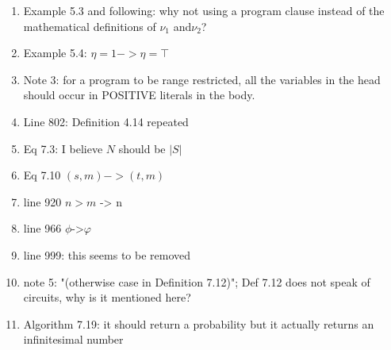 \begin{enumerate}
    \item Example 5.3 and following: why not using a program clause instead of the mathematical definitions of $\nu_1$ and$ \nu_2$?
    \\

    \item Example 5.4: $\eta=1-> \eta=\top$
    \\
    \item Note 3: for a program to be range restricted, all the variables in the head should occur in POSITIVE literals in the body.
    \\
    \item Line 802: Definition 4.14 repeated
    \\
    \item Eq 7.3: I believe $N$ should be $|S|$
    \\
    \item Eq 7.10 $(s,m)->(t,m)$
    \\
    \item line 920 $n>m$ -> n
    \\
    \item line 966 $\phi$->$\varphi$
    \\
    \item line 999: this seems to be removed
    \\
    \item note 5: "(otherwise case in Definition 7.12)"; Def 7.12 does not speak of circuits, why is it mentioned here?
    \\
    \item Algorithm 7.19: it should return a probability but it actually returns an infinitesimal number
    \\

\end{enumerate}
